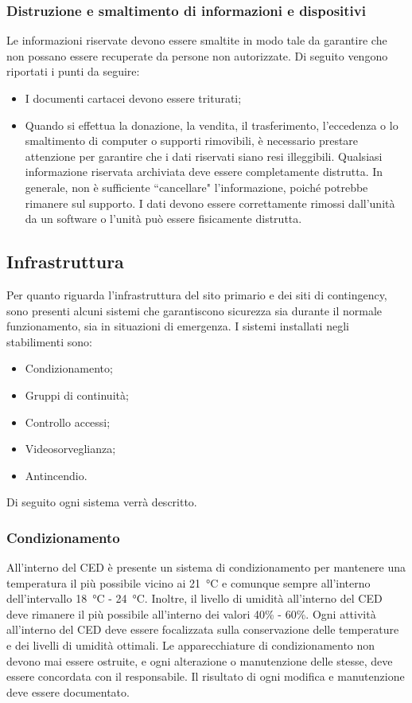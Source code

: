 \documentclass[12pt, a4paper, titlepage]{report}
\begin{document}
		\subsubsection{Distruzione e smaltimento di informazioni e dispositivi}
		Le informazioni riservate devono essere smaltite in modo tale da garantire che non possano essere recuperate da persone non autorizzate. Di seguito vengono riportati i punti da seguire:
		\begin{itemize}
			\item I documenti cartacei devono essere triturati;
			\item Quando si effettua la donazione, la vendita, il trasferimento, l'eccedenza o lo smaltimento di computer o supporti rimovibili, è necessario prestare attenzione per garantire che i dati riservati siano resi illeggibili. Qualsiasi informazione riservata archiviata deve essere completamente distrutta. In generale, non è sufficiente ``cancellare" l'informazione, poiché potrebbe rimanere sul supporto. I dati devono essere correttamente rimossi dall'unità da un software o l'unità può essere fisicamente distrutta.
		\end{itemize}	
	
		
		\subsection{Infrastruttura} \label{infrastruttura}
		Per quanto riguarda l'infrastruttura del sito primario e dei siti di contingency, sono presenti alcuni sistemi che garantiscono sicurezza sia durante il normale funzionamento, sia in situazioni di emergenza.
		I sistemi installati negli stabilimenti sono:
		\begin{itemize}
			\item Condizionamento;
			\item Gruppi di continuità;
			\item Controllo accessi;
			\item Videosorveglianza;
			\item Antincendio.
		\end{itemize}
		Di seguito ogni sistema verrà descritto.
			\subsubsection{Condizionamento}
			All'interno del CED è presente un sistema di condizionamento per mantenere una temperatura il più possibile vicino ai \SI{21}{\celsius} e comunque sempre all'interno dell'intervallo \SI{18}{\celsius} - \SI{24}{\celsius}. Inoltre, il livello di umidità all'interno del CED deve rimanere il più possibile all'interno dei valori 40\% - 60\%. 
			Ogni attività all'interno del CED deve essere focalizzata sulla conservazione delle temperature e dei livelli di umidità ottimali. Le apparecchiature di condizionamento non devono mai essere ostruite, e ogni alterazione o manutenzione delle stesse, deve essere concordata con il responsabile. Il risultato di ogni modifica e manutenzione deve essere documentato.
			
\end{document}
